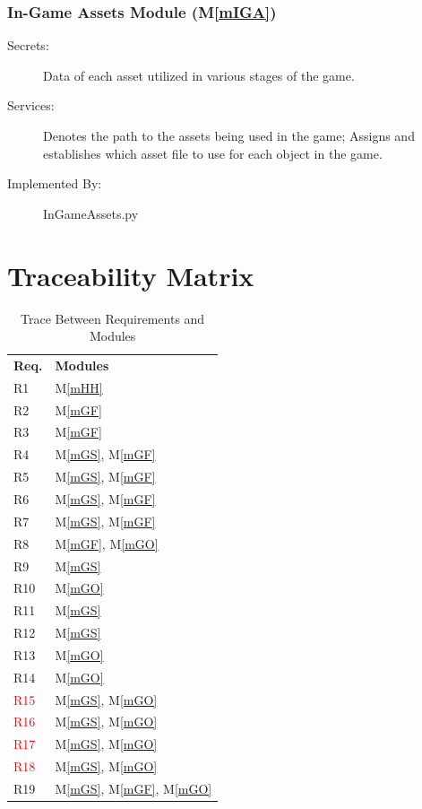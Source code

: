 \documentclass[12pt, titlepage]{article}
\newcommand{\mref}[1]{M\ref{#1}}
\begin{document}
\subsubsection{In-Game Assets Module (\mref{mIGA})}

\begin{description}
\item[Secrets:] Data of each asset utilized in various stages of the game.
\item[Services:] Denotes the path to the assets being used in the game; Assigns and establishes which asset file to use for each object in the game.
\item[Implemented By:]InGameAssets.py
\end{description}

\section{Traceability Matrix} \label{SecTM}
\begin{table}[H]
\centering
\begin{tabular}{p{} p{}}
\toprule
\textbf{Req.} & \textbf{Modules}\\
R1 & \mref{mHH}\\
R2 & \mref{mGF}\\
R3 & \mref{mGF}\\
R4 & \mref{mGS}, \mref{mGF}\\
R5 & \mref{mGS}, \mref{mGF}\\
R6 & \mref{mGS}, \mref{mGF}\\
R7 & \mref{mGS}, \mref{mGF}\\
R8 & \mref{mGF}, \mref{mGO}\\
R9 & \mref{mGS}\\
R10 & \mref{mGO}\\
R11 & \mref{mGS}\\
R12 & \mref{mGS}\\
R13 & \mref{mGO}\\
R14 & \mref{mGO}\\
\textcolor{red}{R15} & \mref{mGS}, \mref{mGO}\\
\textcolor{red}{R16} & \mref{mGS}, \mref{mGO}\\
\textcolor{red}{R17} & \mref{mGS}, \mref{mGO}\\
\textcolor{red}{R18} & \mref{mGS}, \mref{mGO}\\
R19 & \mref{mGS}, \mref{mGF}, \mref{mGO}\\
\bottomrule
\end{tabular}
\caption{Trace Between Requirements and Modules}
\label{TblRT}
\end{table}
\end{document}
